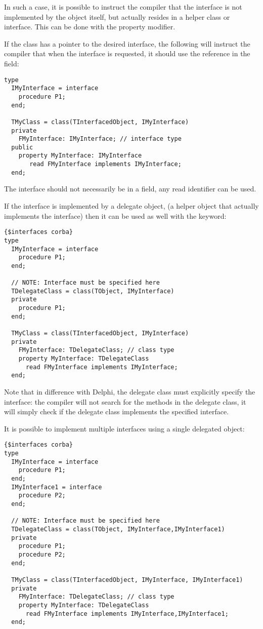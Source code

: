 In such a case, it is possible to instruct the compiler that the interface 
is not implemented by the object itself, but actually resides in a helper 
class or interface. This can be done with the  property modifier.

If the class has a pointer to the desired interface, the following will
instruct the compiler that when the  interface is
requested, it should use the reference in the field:
\begin{verbatim}
type
  IMyInterface = interface
    procedure P1;
  end;
 
  TMyClass = class(TInterfacedObject, IMyInterface)
  private
    FMyInterface: IMyInterface; // interface type
  public
    property MyInterface: IMyInterface 
       read FMyInterface implements IMyInterface;
  end;
\end{verbatim}
The interface should not necessarily be in a field, any read identifier can
be used. 

If the interface is implemented by a delegate object, (a helper object that
actually implements the interface) then it can be used as well with the
 keyword:
\begin{verbatim}
{$interfaces corba}
type
  IMyInterface = interface
    procedure P1;
  end;

  // NOTE: Interface must be specified here
  TDelegateClass = class(TObject, IMyInterface)
  private
    procedure P1;
  end;
 
  TMyClass = class(TInterfacedObject, IMyInterface)
  private
    FMyInterface: TDelegateClass; // class type
    property MyInterface: TDelegateClass 
      read FMyInterface implements IMyInterface;
  end;
\end{verbatim}
Note that in difference with Delphi, the delegate class must explicitly
specify the interface: the compiler will not search for the methods in the
delegate class, it will simply check if the delegate class implements the
specified interface.

It is possible to implement multiple interfaces using a single delegated
object:
\begin{verbatim}
{$interfaces corba}
type
  IMyInterface = interface
    procedure P1;
  end;
  IMyInterface1 = interface
    procedure P2;
  end;

  // NOTE: Interface must be specified here
  TDelegateClass = class(TObject, IMyInterface,IMyInterface1)
  private
    procedure P1;
    procedure P2;
  end;

  TMyClass = class(TInterfacedObject, IMyInterface, IMyInterface1)
  private
    FMyInterface: TDelegateClass; // class type
    property MyInterface: TDelegateClass
      read FMyInterface implements IMyInterface,IMyInterface1;
  end;
\end{verbatim}

